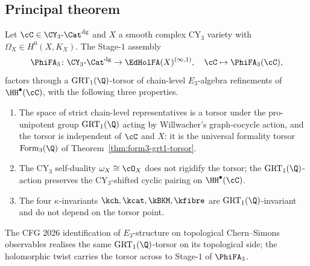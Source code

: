 \subsection*{Principal theorem}

\begin{theorem}
\label{thm:kt-e3-stage-1-pinning-master}
\ClaimStatusTheorem
Let $\cC \in \CY_3\text{-}\Cat^{\mathrm{dg}}$ and $X$ a smooth complex
CY$_3$ variety with $\Omega_X \in H^0(X, K_X)$. The Stage-$1$ assembly
\[
 \PhiFA_3 \colon \CY_3\text{-}\Cat^{\mathrm{dg}} \to \EdHolFA(X)^{(\infty,1)},
 \quad
 \cC \mapsto \PhiFA_3(\cC),
\]
factors through a $\mathrm{GRT}_1(\Q)$-torsor of chain-level $E_3$-algebra
refinements of $\HH^\bullet(\cC)$, with the following three properties.
\begin{enumerate}[label=\textup{(\roman*)}]
\item The space of strict chain-level representatives is a torsor under
the pro-unipotent group $\mathrm{GRT}_1(\Q)$ acting by Willwacher's
graph-cocycle action, and the torsor is independent of $\cC$ and $X$:
it is the universal formality torsor $\mathrm{Form}_3(\Q)$ of
Theorem~\ref{thm:form3-grt1-torsor}.
\item The CY$_3$ self-duality $\omega_X \cong \cO_X$ does not rigidify
the torsor; the $\mathrm{GRT}_1(\Q)$-action preserves the
CY$_3$-shifted cyclic pairing on $\HH^\bullet(\cC)$.
\item The four $\kappa$-invariants
$\kch, \kcat, \kBKM, \kfibre$ are $\mathrm{GRT}_1(\Q)$-invariant and
do not depend on the torsor point.
\end{enumerate}
The CFG $2026$ identification of $E_3$-structure on topological
Chern--Simons observables realises the same $\mathrm{GRT}_1(\Q)$-torsor
on its topological side; the holomorphic twist carries the torsor
across to Stage-$1$ of $\PhiFA_3$.
\end{theorem}
